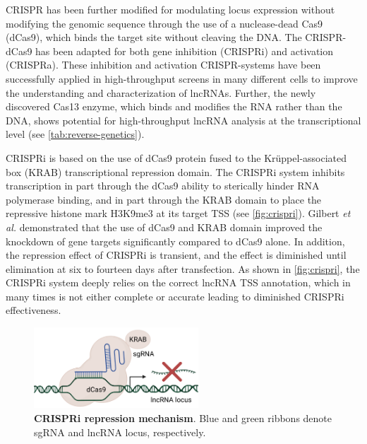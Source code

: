 CRISPR has been further modified for modulating locus expression without modifying the genomic sequence through the use of a nuclease-dead Cas9 (dCas9), which binds the target site without cleaving the DNA.\autocite{qi_2013_crispr} The CRISPR-dCas9 has been adapted for both gene inhibition (CRISPRi\autocite{gilbert_2013_crispri}) and activation (CRISPRa\autocite{maeder_2013_crispra,konermann_2015_crispra}). These inhibition and activation CRISPR-systems have been successfully applied in high-throughput screens in many different cells to improve the understanding and characterization of lncRNAs.\autocite{liu_2017_crispri,liu_2020_crispri_glioma,Haswell_2021_crispri} Further, the newly discovered Cas13 enzyme, which binds and modifies the RNA rather than the DNA, shows potential for high-throughput lncRNA analysis at the transcriptional level\autocite{guo_2021_cas13} (see \autoref{tab:reverse-genetics}).

CRISPRi is based on the use of dCas9 protein fused to the Krüppel-associated box (KRAB) transcriptional repression domain.\autocite{gilbert_2013_crispri} The CRISPRi system inhibits transcription in part through the dCas9 ability to sterically hinder RNA polymerase binding, and in part through the KRAB domain to place the repressive histone mark H3K9me3 at its target TSS\autocite{gilbert_2013_crispri,larson_2013_crispri,morelli_2021_crispr} (see \autoref{fig:crispri}). Gilbert \textit{et al.} demonstrated that the use of dCas9 and KRAB domain improved the knockdown of gene targets significantly compared to dCas9 alone.\autocite{gilbert_2013_crispri} In addition, the repression effect of CRISPRi is transient, and the effect is diminished until elimination at six to fourteen days after transfection.\autocite{nunez_2021_crispr} As shown in \autoref{fig:crispri}, the CRISPRi system deeply relies on the correct lncRNA TSS annotation, which in many times is not either complete or accurate leading to diminished CRISPRi effectiveness. 

\begin{figure}[!htb]
  \centering
  \includegraphics[width=0.55\textwidth]{img/introduction/CRISPRi.png}
  \caption[CRISPRi repression mechanism]{\textbf{CRISPRi repression mechanism}. Blue and green ribbons denote sgRNA and lncRNA locus, respectively.}
  \label{fig:crispri}
\end{figure}

